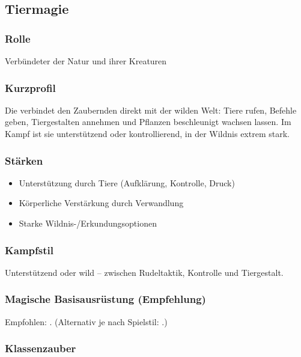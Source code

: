 \subsection{Tiermagie}

\subsubsection*{Rolle}
Verbündeter der Natur und ihrer Kreaturen

\subsubsection*{Kurzprofil}
Die  verbindet den Zaubernden direkt mit der wilden Welt:
Tiere rufen, Befehle geben, Tiergestalten annehmen und Pflanzen beschleunigt wachsen lassen.
Im Kampf ist sie unterstützend oder kontrollierend, in der Wildnis extrem stark.

\subsubsection*{Stärken}
\begin{itemize}
	\item Unterstützung durch Tiere (Aufklärung, Kontrolle, Druck)
	\item Körperliche Verstärkung durch Verwandlung
	\item Starke Wildnis-/Erkundungsoptionen
\end{itemize}

\subsubsection*{Kampfstil}
Unterstützend oder wild -- zwischen Rudeltaktik, Kontrolle und Tiergestalt.

\subsubsection*{Magische Basisausrüstung (Empfehlung)}
Empfohlen: .  
(Alternativ je nach Spielstil: .)

\subsubsection*{Klassenzauber}

